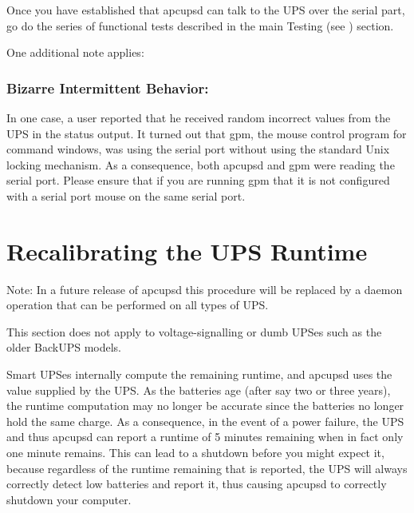 {{{{{{{{{\label{index-Testing-230}
Once you have established that apcupsd can talk to the UPS over the serial
part, go do the series of functional tests described in the main Testing (see 
) section.  

One additional note applies: 

\label{Bizarre-Intermittent-Behavior}

\subsubsection*{Bizarre Intermittent Behavior:}

In one case, a user reported that he received random incorrect values from the
UPS in the status output. It turned out that gpm, the mouse control program
for command windows, was using the serial port without using the standard Unix
locking mechanism. As a consequence, both apcupsd and gpm were reading the
serial port. Please ensure that if you are running gpm that it is not
configured with a serial port mouse on the same serial port. 

\label{Recalibrating-the-UPS-Runtime}

\section*{Recalibrating the UPS Runtime}

\label{index-Runtime-recalibration-231}
\label{index-Recalibration-Runtime-232}
Note: In a future release of apcupsd this procedure will be replaced by a
daemon operation that can be performed on all types of UPS.  

This section does not apply to voltage-signalling or dumb UPSes such as the
older BackUPS models.  

Smart UPSes internally compute the remaining runtime, and apcupsd uses the
value supplied by the UPS. As the batteries age (after say two or three
years), the runtime computation may no longer be accurate since the batteries
no longer hold the same charge. As a consequence, in the event of a power
failure, the UPS and thus apcupsd can report a runtime of 5 minutes remaining
when in fact only one minute remains. This can lead to a shutdown before you
might expect it, because regardless of the runtime remaining that is reported,
the UPS will always correctly detect low batteries and report it, thus causing
apcupsd to correctly shutdown your computer.  

}}}}}}}}}
